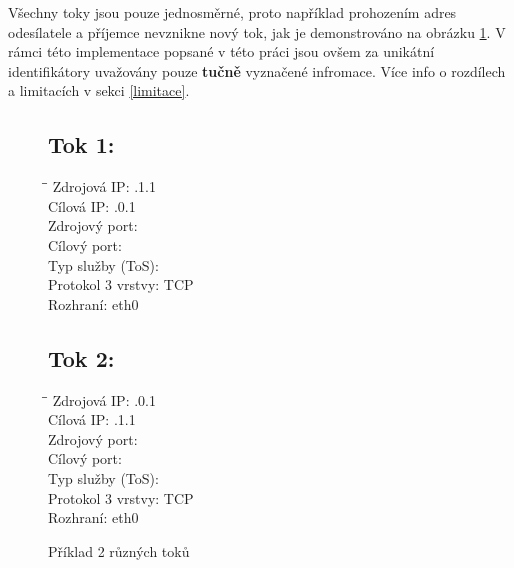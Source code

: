 \documentclass[11pt, a4paper, hidelinks]{article}[08.10.2023]
\begin{document}
    Všechny toky jsou pouze jednosměrné, proto například prohozením adres odesílatele a příjemce nevznikne
    nový tok, jak je demonstrováno na obrázku \ref{priklad1}. V rámci této implementace popsané v této práci jsou ovšem za unikátní identifikátory uvažovány
    pouze \textbf{tučně} vyznačené infromace. Více info o rozdílech a limitacích v sekci \ref{limitace}.
    \vspace{2cm}

    \begin{figure}[h!]
        \begin{minipage}[t]{0.45\textwidth}
            \subsection*{Tok 1:}
            \begin{tabbing}
                \hspace*{4cm}\=\hspace*{4cm}\= \kill
                Zdrojová IP: .1.1 \\
                Cílová IP: .0.1 \\
                Zdrojový port:  \\
                Cílový port:  \\
                Typ služby (ToS):  \\
                Protokol 3 vrstvy: \> TCP \\
                Rozhraní: \> eth0 \\
            \end{tabbing}
        \end{minipage}
            \hfill
        \begin{minipage}[t]{0.45\textwidth}
            \subsection*{Tok 2:}
            \begin{tabbing}
                \hspace*{4cm}\=\hspace*{4cm}\= \kill
                Zdrojová IP: .0.1 \\
                Cílová IP: .1.1 \\
                Zdrojový port:  \\
                Cílový port:  \\
                Typ služby (ToS):  \\
                Protokol 3 vrstvy: \> TCP \\
                Rozhraní: \> eth0 \\
            \end{tabbing}
        \end{minipage}
        \caption{Příklad 2 různých toků}
        \label{priklad1}
    \end{figure}
\end{document}
